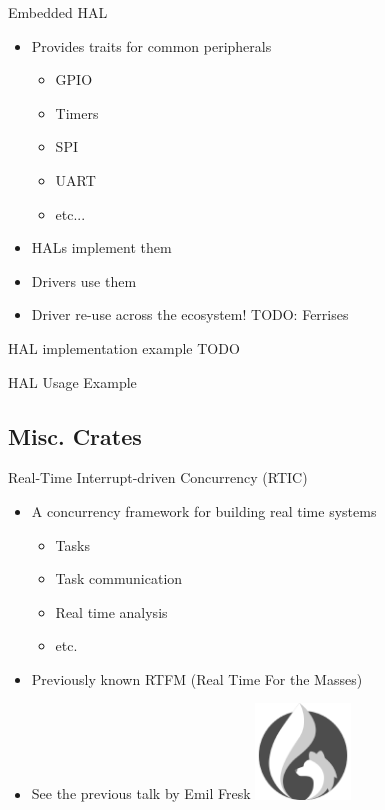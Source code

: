 \documentclass[169]{beamer}
\begin{document}
\begin{frame}{Embedded HAL}
    \begin{itemize}
        \item Provides traits for common peripherals
        \begin{itemize}
            \item GPIO
            \item Timers
            \item SPI
            \item UART
            \item etc...
        \end{itemize}
        \item HALs implement them
        \item Drivers use them
        \item Driver re-use across the ecosystem!
        TODO: Ferrises
    \end{itemize}
\end{frame}

\begin{frame}{HAL implementation example}
    TODO
\end{frame}

\begin{frame}{HAL Usage Example}
    
\end{frame}

\begin{frame}
    \section{Misc. Crates}
\end{frame}

\begin{frame}{Real-Time Interrupt-driven Concurrency (RTIC)}
    \begin{itemize}
        \item A concurrency framework for building real time systems
        \begin{itemize}
            \item Tasks
            \item Task communication
            \item Real time analysis
            \item etc.
        \end{itemize}
        \item Previously known RTFM (Real Time For the Masses)
        \item{See the previous talk by Emil Fresk}
        \hspace*{7cm}\includegraphics[width=0.2\textwidth]{fig/rtic.png}
    \end{itemize}
\end{frame}
\end{document}
